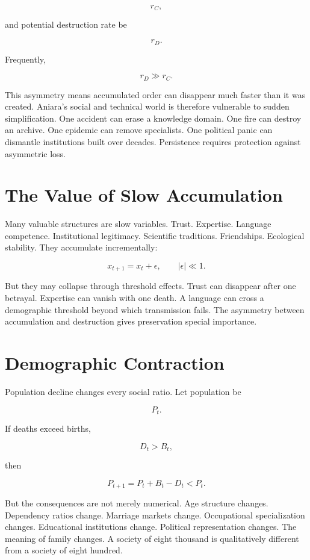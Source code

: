 \documentclass[11pt,oneside]{book}
\theoremstyle{definition}
\theoremstyle{remark}
\begin{document}
\[
r_C,
\]

and potential destruction rate be

\[
r_D.
\]

Frequently,

\[
r_D\gg r_C.
\]

This asymmetry means accumulated order can disappear much faster than it was created. Aniara's
social and technical world is therefore vulnerable to sudden simplification. One accident can erase
a knowledge domain. One fire can destroy an archive. One epidemic can remove specialists. One
political panic can dismantle institutions built over decades. Persistence requires protection
against asymmetric loss.

\section{The Value of Slow Accumulation}

Many valuable structures are slow variables. Trust. Expertise. Language competence. Institutional
legitimacy. Scientific traditions. Friendships. Ecological stability. They accumulate incrementally:

\[
x_{t+1} = x_t+\epsilon, \qquad |\epsilon|\ll1.
\]

But they may collapse through threshold effects. Trust can disappear after one betrayal. Expertise
can vanish with one death. A language can cross a demographic threshold beyond which transmission
fails. The asymmetry between accumulation and destruction gives preservation special importance.

\section{Demographic Contraction}

Population decline changes every social ratio. Let population be

\[
P_t.
\]

If deaths exceed births,

\[
D_t>B_t,
\]

then

\[
P_{t+1} = P_t+B_t-D_t < P_t.
\]

But the consequences are not merely numerical. Age structure changes. Dependency ratios change.
Marriage markets change. Occupational specialization changes. Educational institutions change.
Political representation changes. The meaning of family changes. A society of eight thousand is
qualitatively different from a society of eight hundred.
\end{document}
